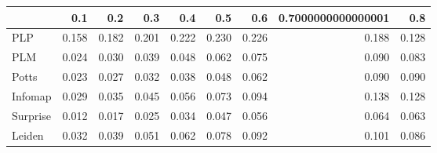 \begin{tabular}{lrrrrrrrr}
\toprule
{} &   0.1 &   0.2 &   0.3 &   0.4 &   0.5 &   0.6 & 0.7000000000000001 &   0.8 \\
\midrule
PLP      & 0.158 & 0.182 & 0.201 & 0.222 & 0.230 & 0.226 &              0.188 & 0.128 \\
PLM      & 0.024 & 0.030 & 0.039 & 0.048 & 0.062 & 0.075 &              0.090 & 0.083 \\
Potts    & 0.023 & 0.027 & 0.032 & 0.038 & 0.048 & 0.062 &              0.090 & 0.090 \\
Infomap  & 0.029 & 0.035 & 0.045 & 0.056 & 0.073 & 0.094 &              0.138 & 0.128 \\
Surprise & 0.012 & 0.017 & 0.025 & 0.034 & 0.047 & 0.056 &              0.064 & 0.063 \\
Leiden   & 0.032 & 0.039 & 0.051 & 0.062 & 0.078 & 0.092 &              0.101 & 0.086 \\
\bottomrule
\end{tabular}
